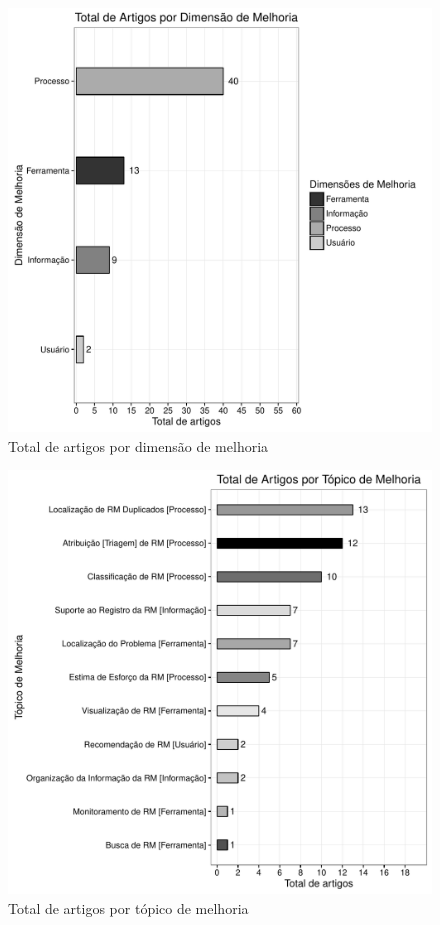 \begin{figure}[htpb]
	\centering
	\includegraphics[width=0.9\linewidth]{./chapter-mapeamento-sistematico/img/grafico_dim_melhoria_por_artigo.pdf}
	\caption{Total de artigos por dimensão de melhoria}
	\label{fig:grafico_dim_melhoria_por_artigo}
\end{figure}

\begin{figure}[htpb]
	\centering
	\includegraphics[width=0.8\linewidth]{./chapter-mapeamento-sistematico/img/grafico_topico_por_artigo.pdf}
	\caption{Total de artigos por tópico de melhoria}
	\label{fig:grafico_topico_por_artigo}
\end{figure}

